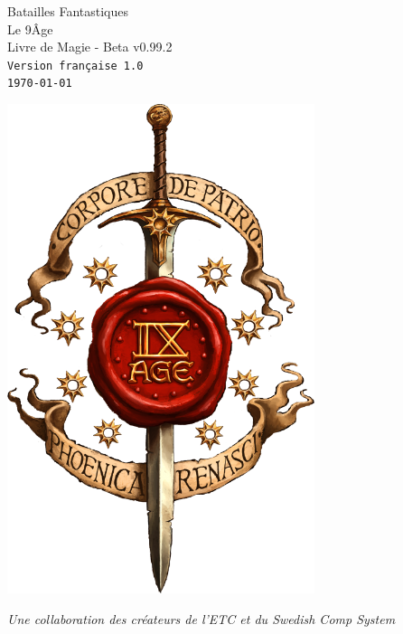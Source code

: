 \begin{titlepage}
\begin{center}


{\fontsize{50}{60}\selectfont Batailles Fantastiques \\ Le 9\ieme Âge} \\
\vspace{0.7cm}
{\fontsize{20}{24}\selectfont Livre de Magie - Beta v0.99.2} \\
\vspace{0.4cm}
{\fontsize{14}{16.8}\selectfont \texttt{Version française 1.0}} \\
{\fontsize{14}{16.8}\selectfont \texttt{\today}} \\

\vfill

\includegraphics[width=9cm]{logo_9th.png}

\vfill

{\fontsize{12}{14.4}\selectfont \textit{Une collaboration des créateurs de l'ETC et du Swedish Comp System}} \\


\end{center}

\newpage

\thispagestyle{empty}


\end{titlepage}
